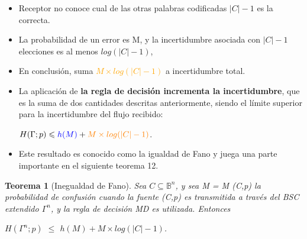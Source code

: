 \documentclass{beamer}
\theoremstyle{plain}
\newtheorem{teorema} [Teorema] {Teorema}
\theoremstyle{example}
\theoremstyle{example}
\begin{document}
\begin{frame}
\begin{itemize}
\begin{enumerate}
\begin{itemize}\footnotesize  

\item Receptor no conoce cual de las otras palabras codificadas $|C| - 1$ es la correcta. 

\item   La probabilidad de un error es M, y la incertidumbre asociada con $|C| - 1$ elecciones es al menos $log(|C| - 1)$,
\item   En conclusión, suma   \textcolor{orange}{$M \times log(|C| - 1)$} a incertidumbre total.

\end{itemize}

\end{enumerate}
\end{itemize}

 \end{frame} 


\begin{frame}  \small  
\begin{itemize}

 \item  La aplicación de \textbf{la regla de decisión incrementa la incertidumbre}, que es la suma de dos cantidades descritas anteriormente, siendo el límite superior para la incertidumbre del flujo recibido:

\begin{center}
$H(\Gamma;p) \leqslant \textcolor{blue}{h(M)} + \textcolor{orange}{M \times log(|C|-1)}$. 
\end{center}

\item Este resultado es conocido como la igualdad de Fano y juega una parte importante en el siguiente teorema 12.

\end{itemize}

\begin{teorema}[Inegualdad de Fano]
Sea $C \subseteq \mathbb{B}^n$, y sea M = M (C,p) la probabilidad de confusión cuando la fuente (C,p) es transmitida a través del BSC extendido $\Gamma^n$, y la regla de decisión MD es utilizada. Entonces

\begin{center}
$H(\Gamma^n;p)$ $\leq$ $h(M)+M \times log(|C|-1)$.
\end{center}

\end{teorema}
 \end{frame} 
\end{document}
